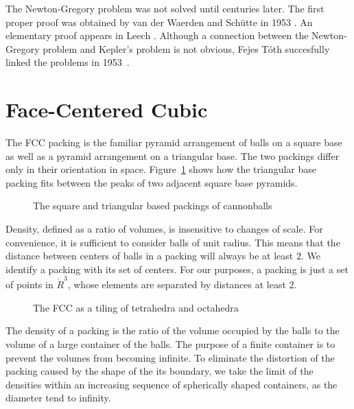 The Newton-Gregory problem was not solved until centuries later.
The first proper proof was obtained by van der Waerden and
Sch\"utte in 1953 \cite{Sch53}.  An elementary proof appears in Leech
\cite{Leech:1956:MG}.  Although a connection between the Newton-Gregory
problem and Kepler's problem is not obvious, Fejes T\'oth succesfully linked the
problems in 1953~\cite{Fej53}.


\section{Face-Centered Cubic}



The FCC packing is the familiar pyramid arrangement of
balls on a square base as well as a pyramid arrangement on a
triangular base.  The two packings
differ only in their orientation in space.
Figure~\ref{fig:tri-square-cannonballs} shows how the triangular base
packing fits between the peaks of two adjacent square base pyramids.

\begin{figure}[htb]
  \centering
  \caption{The square and triangular based packings of cannonballs}
  \label{fig:tri-square-cannonballs}
\end{figure}

Density, defined as a ratio of volumes, is insensitive to changes of
scale.  For convenience, it is sufficient to consider balls of unit
radius. This means that the distance between centers of balls in a
packing will always be at least $2$.  We identify a packing with its set
of centers.   For our purposes, a packing is just a set of points
in $\ring{R}^3$, whose elements are separated by distances at least
$2$.


\begin{figure}[htb]
  \centering
  \caption{The FCC as a tiling of tetrahedra and octahedra}
  \label{fig:tet-oct}
\end{figure}

The density of a packing is the ratio of the volume occupied by the
balls to the volume of a large container of the balls.  The
purpose of a finite container is to prevent the volumes from becoming
infinite.  To eliminate the distortion of the packing caused by the
shape of the its boundary, we take the limit of the densities within an increasing
sequence of spherically shaped containers, as the diameter tend to infinity.

